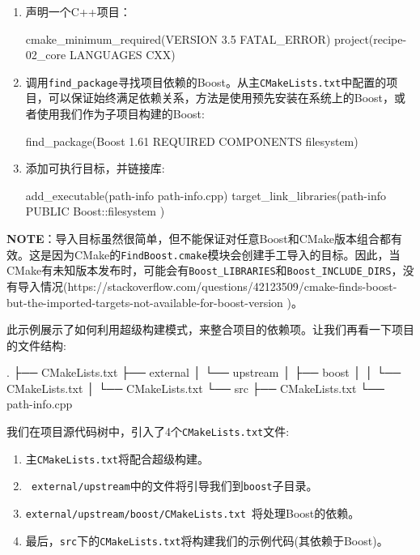 \begin{enumerate}
\item 声明一个C++项目：

\begin{codebox}[cmake]
cmake_minimum_required(VERSION 3.5 FATAL_ERROR)
project(recipe-02_core LANGUAGES CXX)
\end{codebox}

\item 调用\texttt{find\_package}寻找项目依赖的Boost。从主\texttt{CMakeLists.txt}中配置的项目，可以保证始终满足依赖关系，方法是使用预先安装在系统上的Boost，或者使用我们作为子项目构建的Boost:

\begin{codebox}[cmake]
find_package(Boost 1.61 REQUIRED COMPONENTS filesystem)
\end{codebox}

\item 添加可执行目标，并链接库:

\begin{codebox}[cmake]
add_executable(path-info path-info.cpp)
target_link_libraries(path-info
  PUBLIC
    Boost::filesystem
  ) 
\end{codebox}

\end{enumerate}

\begin{myInfoBox}
\textbf{NOTE}：导入目标虽然很简单，但不能保证对任意Boost和CMake版本组合都有效。这是因为CMake的\texttt{FindBoost.cmake}模块会创建手工导入的目标。因此，当CMake有未知版本发布时，可能会有\texttt{Boost\_LIBRARIES}和\texttt{Boost\_INCLUDE\_DIRS}，没有导入情况(https://stackoverflow.com/questions/42123509/cmake-finds-boost-but-the-imported-targets-not-available-for-boost-version )。
\end{myInfoBox}


此示例展示了如何利用超级构建模式，来整合项目的依赖项。让我们再看一下项目的文件结构:

\begin{codebox}[shell]
.
├── CMakeLists.txt
├── external
│    └── upstream
│        ├── boost
│        │    └── CMakeLists.txt
│        └── CMakeLists.txt
└── src
    ├── CMakeLists.txt
    └── path-info.cpp
\end{codebox}

我们在项目源代码树中，引入了4个\texttt{CMakeLists.txt}文件:

\begin{enumerate}
\item 主\texttt{CMakeLists.txt}将配合超级构建。

\item \texttt{ external/upstream}中的文件将引导我们到\texttt{boost}子目录。

\item \texttt{external/upstream/boost/CMakeLists.txt }将处理Boost的依赖。

\item 最后，\texttt{src}下的\texttt{CMakeLists.txt}将构建我们的示例代码(其依赖于Boost)。

\end{enumerate}

